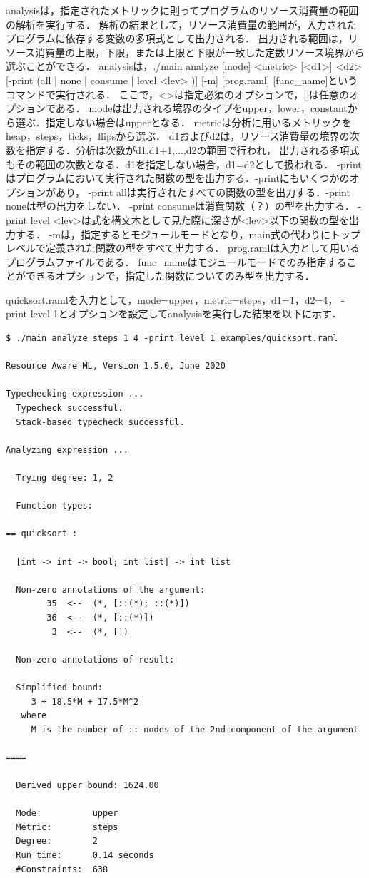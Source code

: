 \documentclass{kuisthesis}
\begin{document}
analysisは，指定されたメトリックに則ってプログラムのリソース消費量の範囲の解析を実行する．
解析の結果として，リソース消費量の範囲が，入力されたプログラムに依存する変数の多項式として出力される．
出力される範囲は，リソース消費量の上限，下限，または上限と下限が一致した定数リソース境界から選ぶことができる．
analysisは，./main analyze [mode] <metric> [<d1>] <d2> [-print (all | none | consume | level <lev> )] [-m] [prog.raml] [func\_name]というコマンドで実行される．
ここで，<>は指定必須のオプションで，[]は任意のオプションである．
modeは出力される境界のタイプをupper，lower，constantから選ぶ．指定しない場合はupperとなる．
metricは分析に用いるメトリックをheap，steps，ticks，flipsから選ぶ．
d1およびd2は，リソース消費量の境界の次数を指定する．分析は次数がd1,d1+1,...,d2の範囲で行われ，
出力される多項式もその範囲の次数となる．d1を指定しない場合，d1=d2として扱われる．
-printはプログラムにおいて実行された関数の型を出力する．-printにもいくつかのオプションがあり，
-print allは実行されたすべての関数の型を出力する．-print noneは型の出力をしない．
-print consumeは消費関数（？）の型を出力する．
-print level <lev>は式を構文木として見た際に深さが<lev>以下の関数の型を出力する．
-mは，指定するとモジュールモードとなり，main式の代わりにトップレベルで定義された関数の型をすべて出力する．
prog.ramlは入力として用いるプログラムファイルである．
func\_nameはモジュールモードでのみ指定することができるオプションで，指定した関数についてのみ型を出力する．

quicksort.ramlを入力として，mode=upper，metric=steps，d1=1，d2=4，
-print level 1とオプションを設定してanalysisを実行した結果を以下に示す．

\begin{lstlisting}[basicstyle={\ttfamily\color{base}\scriptsize}]
$ ./main analyze steps 1 4 -print level 1 examples/quicksort.raml

Resource Aware ML, Version 1.5.0, June 2020

Typechecking expression ...
  Typecheck successful.
  Stack-based typecheck successful.

Analyzing expression ...

  Trying degree: 1, 2

  Function types:

== quicksort :

  [int -> int -> bool; int list] -> int list

  Non-zero annotations of the argument:
        35  <--  (*, [::(*); ::(*)])
        36  <--  (*, [::(*)])
         3  <--  (*, [])

  Non-zero annotations of result:

  Simplified bound:
     3 + 18.5*M + 17.5*M^2
   where
     M is the number of ::-nodes of the 2nd component of the argument

====

  Derived upper bound: 1624.00

  Mode:          upper
  Metric:        steps
  Degree:        2
  Run time:      0.14 seconds
  #Constraints:  638
\end{lstlisting}
\end{document}
